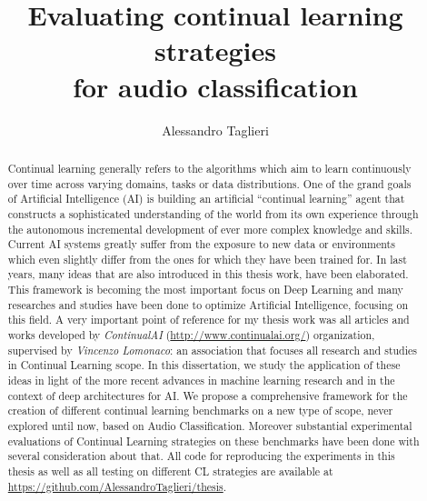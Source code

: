 \documentclass[english, LaM, oneside]{sapthesis}%
\title{Evaluating continual learning strategies \\for audio classification}
\author{Alessandro Taglieri}
\begin{document}
\frontmatter
\maketitle

\dedication{To my beloved parents and brother}

\begin{abstract}
Continual learning generally refers to the algorithms which aim to learn continuously over time across varying domains, tasks or data distributions.
\newline \newline
One of the grand goals of Artificial Intelligence (AI) is building an artificial “continual learning” agent that constructs a sophisticated understanding of the world from its own experience through the autonomous incremental development of ever more complex knowledge and skills.  Current AI systems greatly suffer from the exposure to new data or environments which even slightly differ from the ones for which they have been trained for.
\newline \newline
In last years, many ideas that are also introduced in this thesis work, have been elaborated. This framework is becoming the most important focus on Deep Learning and many researches and studies have been done to optimize Artificial Intelligence, focusing on this field. A very important point of reference for my thesis work was all articles and works developed by \textit{ContinualAI} (\url{http://www.continualai.org/}) organization, supervised by \textit{Vincenzo Lomonaco}: an association that focuses all research and studies in Continual Learning scope.
\newline \newline
In this dissertation, we study the application of these ideas in light of the more recent advances in machine learning research and in the context of deep architectures for AI. We propose a comprehensive framework for the creation of different continual learning benchmarks on a new type of scope, never explored until now, based on Audio Classification. Moreover  substantial experimental evaluations of Continual Learning strategies on these benchmarks have been done with several consideration about that. All code for reproducing the experiments in this thesis as well as all testing on different CL strategies are available at \url{https://github.com/AlessandroTaglieri/thesis}.
\end{abstract}
\clearpage\null
\end{document}
